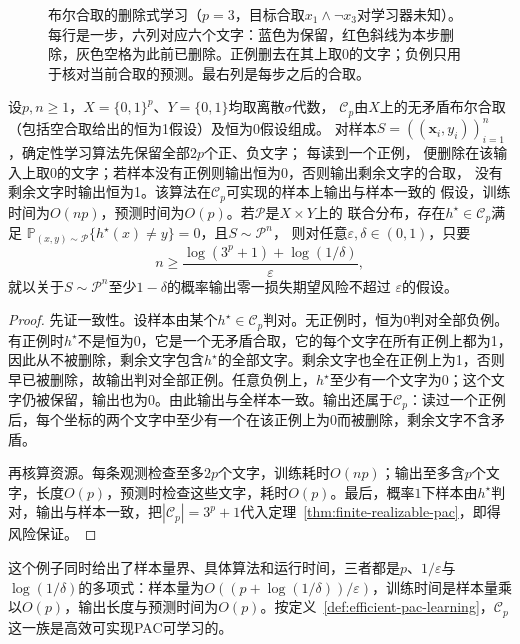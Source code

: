 \begin{figure}[htbp]
  \centering
  
  \caption{布尔合取的删除式学习（$p=3$，目标合取$x_1\wedge\neg x_3$对学习器未知）。每行是一步，六列对应六个文字：蓝色为保留，红色斜线为本步删除，灰色空格为此前已删除。正例删去在其上取0的文字；负例只用于核对当前合取的预测。最右列是每步之后的合取。}
  \label{fig:lt5-conjunction-elimination}
\end{figure}

\begin{theorem}[布尔合取的高效可实现学习]
\label{thm:efficient-conjunction-learning}
设$p,n\geq1$，$X=\{0,1\}^p$、$Y=\{0,1\}$均取离散$\sigma$代数，
$\mathcal C_p$由$X$上的无矛盾布尔合取（包括空合取给出的恒为1假设）及恒为0假设组成。
对样本$S=((\bm x_i,y_i))_{i=1}^n$，确定性学习算法先保留全部$2p$个正、负文字；
每读到一个正例，
便删除在该输入上取0的文字；若样本没有正例则输出恒为0，否则输出剩余文字的合取，
没有剩余文字时输出恒为1。该算法在$\mathcal C_p$可实现的样本上输出与样本一致的
假设，训练时间为$O(np)$，预测时间为$O(p)$。若$\mathcal P$是$X\times Y$上的
联合分布，存在$h^\star\in\mathcal C_p$满足
$\mathbb P_{(x,y)\sim\mathcal P}\{h^\star(x)\neq y\}=0$，且$S\sim\mathcal P^n$，
则对任意$\varepsilon,\delta\in(0,1)$，只要
\[
 n\geq\frac{\log(3^p+1)+\log(1/\delta)}{\varepsilon},
\]
就以关于$S\sim\mathcal P^n$至少$1-\delta$的概率输出零一损失期望风险不超过
$\varepsilon$的假设。
\end{theorem}

\begin{proof}
先证一致性。设样本由某个$h^\star\in\mathcal C_p$判对。无正例时，恒为0判对全部负例。有正例时$h^\star$不是恒为0，它是一个无矛盾合取，它的每个文字在所有正例上都为1，因此从不被删除，剩余文字包含$h^\star$的全部文字。剩余文字也全在正例上为1，否则早已被删除，故输出判对全部正例。任意负例上，$h^\star$至少有一个文字为0；这个文字仍被保留，输出也为0。由此输出与全样本一致。输出还属于$\mathcal C_p$：读过一个正例后，每个坐标的两个文字中至少有一个在该正例上为0而被删除，剩余文字不含矛盾。

再核算资源。每条观测检查至多$2p$个文字，训练耗时$O(np)$；输出至多含$p$个文字，长度$O(p)$，预测时检查这些文字，耗时$O(p)$。最后，概率$1$下样本由$h^\star$判对，输出与样本一致，把$|\mathcal C_p|=3^p+1$代入定理~\ref{thm:finite-realizable-pac}，即得风险保证。
\end{proof}

这个例子同时给出了样本量界、具体算法和运行时间，三者都是$p$、$1/\varepsilon$与$\log(1/\delta)$的多项式：样本量为$O((p+\log(1/\delta))/\varepsilon)$，训练时间是样本量乘以$O(p)$，输出长度与预测时间为$O(p)$。按定义~\ref{def:efficient-pac-learning}，$\mathcal C_p$这一族是高效可实现PAC可学习的。

